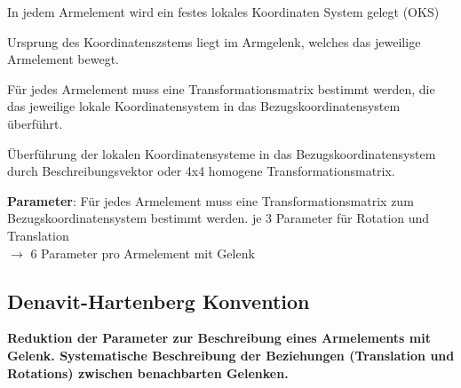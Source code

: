 \begin{compactitem}
    \item In jedem Armelement wird ein festes lokales Koordinaten System gelegt (OKS)
    \item Ursprung des Koordinatenszstems liegt im Armgelenk, welches das jeweilige
    Armelement bewegt.
    \item Für jedes Armelement muss eine Transformationsmatrix bestimmt werden, die das jeweilige
    lokale Koordinatensystem in das Bezugskoordinatensystem überführt.
    \item Überführung der lokalen Koordinatensysteme in das Bezugskoordinatensystem durch
    Beschreibungsvektor oder 4x4 homogene Transformationsmatrix.
    \item \textbf{Parameter}: Für jedes Armelement muss eine Transformationsmatrix zum
    Bezugskoordinatensystem bestimmt werden. je 3 Parameter für Rotation und Translation \\
    $\rightarrow$ 6 Parameter pro Armelement mit Gelenk
\end{compactitem}

\subsection{Denavit-Hartenberg Konvention}
\textbf{Reduktion der Parameter zur Beschreibung eines Armelements mit Gelenk. Systematische Beschreibung
der Beziehungen (Translation und Rotations) zwischen benachbarten Gelenken.}

